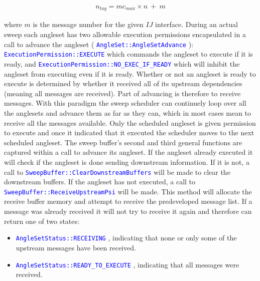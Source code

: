 \documentclass[11pt,letterpaper,titlepage]{article}
\newcommand{\xmltag}[1]{\textcolor{blue}{ \texttt{#1}} }
\newcommand{\beqn}{\begin{equation}
	\begin{aligned}}
\newcommand{\eeqn}{\end{aligned}
	\end{equation}}
\numberwithin{equation}{section}
\begin{document}
\beqn
n_{tag} = mc_{max} \times n \ + \ m
\eeqn

where $m$ is the message number for the given $IJ$ interface.
\newline
\newline
During an actual sweep each angleset has two allowable execution permissions encapsulated in a call to advance the angleset (\xmltag{AngleSet::AngleSetAdvance}):\newline \xmltag{ExecutionPermission::EXECUTE} which commands the angleset to execute if it is ready, and \newline \xmltag{ExecutionPermission::NO\_EXEC\_IF\_READY} which will inhibit the angleset from executing even if it is ready.
Whether or not an angleset is ready to execute is determined by whether it received all of its upstream dependencies (meaning all messages are received). Part of advancing is therefore to receive messages. With this paradigm the sweep scheduler can continuely loop over all the anglesets and advance them as far as they can, which in most cases mean to receive all the messages available. Only the scheduled angleset is given permission to execute and once it indicated that it executed the scheduler moves to the next scheduled angleset. 
\newline
\newline
The sweep buffer's second and third general functions are captured within a call to advance its angleset. If the angleset already executed it will check if the angleset is done sending downstream information. If it is not, a call to \xmltag{SweepBuffer::ClearDownstreamBuffers} will be made to clear the downstream buffers. If the angleset has not executed, a call to \xmltag{SweepBuffer::ReceiveUpstreamPsi} will be made. This method will allocate the receive buffer memory and attempt to receive the predeveloped message list. If a message was already received it will not try to receive it again and therefore can return one of two states:
\begin{itemize}
\item \xmltag{AngleSetStatus::RECEIVING}, indicating that none or only some of the upstream messages have been received.
\item \xmltag{AngleSetStatus::READY\_TO\_EXECUTE}, indicating that all messages were received.
\end{itemize}
\end{document}
